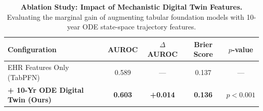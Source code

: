 \begin{table}[h]
\centering
\caption{\textbf{Ablation Study: Impact of Mechanistic Digital Twin Features.} Evaluating the marginal gain of augmenting tabular foundation models with 10-year ODE state-space trajectory features.}
\label{tab:ablation_results}
\vspace{2mm}
\begin{tabular}{lcccc}
\toprule
\textbf{Configuration} & \textbf{AUROC} & \textbf{$\Delta$ AUROC} & \textbf{Brier Score} & \textbf{$p$-value} \\
\midrule
EHR Features Only (TabPFN) & 0.589 & --- & 0.137 & --- \\
\textbf{+ 10-Yr ODE Digital Twin (Ours)} & \textbf{0.603} & \textbf{+0.014} & \textbf{0.136} & \textbf{$p < 0.001$} \\
\bottomrule
\end{tabular}
\end{table}